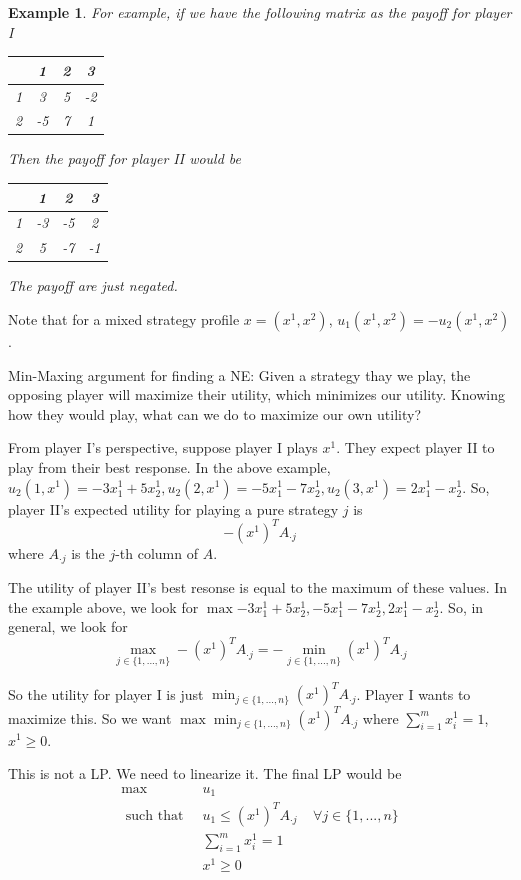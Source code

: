 \documentclass[twoside]{article}
\newtheorem{protoexample}[prototheorem]{Example}
\newenvironment{example}
{\colorlet{shadecolor}{red!15}\begin{shaded}\begin{protoexample}\normalfont}
		{\end{protoexample}\end{shaded}}
\begin{document}
\begin{example}
	For example, if we have the following matrix as the payoff for player I \begin{center}
	\begin{tabular}{|c|c|c|c|}
		\hline
		  & 1  & 2 & 3  \\
		\hline
		1 & 3  & 5 & -2 \\
		\hline
		2 & -5 & 7 & 1  \\
		\hline
	\end{tabular}
	\end{center} Then the payoff for player II would be \begin{center}
	\begin{tabular}{|c|c|c|c|}
		\hline
		  & 1  & 2  & 3  \\
		\hline
		1 & -3 & -5 & 2  \\
		\hline
		2 & 5  & -7 & -1 \\
		\hline
	\end{tabular}
	\end{center}
	The payoff are just negated. 
\end{example}
Note that for a mixed strategy profile $x = (x^1, x^2)$, $u_1(x^1, x^2) = -u_2(x^1, x^2)$. 

Min-Maxing argument for finding a NE: Given a strategy thay we play, the opposing player will maximize their utility, which minimizes our utility. Knowing how they would play, what can we do to maximize our own utility? 

From player I's perspective, suppose player I plays $x^1$. They expect player II to play from their best response. In the above example, $u_2(1, x^1) = -3x_1^1 + 5x_2^1, u_2(2, x^1) = -5x_1^1 -7x_2^1, u_2(3, x^1) = 2x_1^1-x_2^1$. So, player II's expected utility for playing a pure strategy $j$ is $$-(x^1)^TA_{\cdot j}$$ where $A_{\cdot j}$ is the $j$-th column of $A$. 

The utility of player II's best resonse is equal to the maximum of these values. In the example above, we look for $\max{-3x_1^1 + 5x_2^1, -5x_1^1 -7x_2^1, 2x_1^1-x_2^1}$. So, in general, we look for $$\max_{j \in \{1, ..., n\}} -(x^1)^TA_{\cdot j} = -\min_{j \in \{1, ..., n\}} (x^1)^TA_{\cdot j}$$

So the utility for player I is just $\min_{j \in \{1, ..., n\}} (x^1)^TA_{\cdot j}$. Player I wants to maximize this. So we want $\max \min_{j \in \{1, ..., n\}} (x^1)^TA_{\cdot j}$ where $\sum_{i=1}^m x_i^1 = 1$, $x^1 \geq 0$. 

This is not a LP. We need to linearize it. The final LP would be \begin{align*}
\max &\;\;u_1\\
\text{ such that} & \;\;u_1 \leq (x^1)^TA_{\cdot j} \;\;\;\;\forall j \in \{1, ..., n\}\\
&\;\;\sum_{i=1}^m x_i^1 = 1\\
&\;\;x^1 \geq 0
\end{align*}
\end{document}
